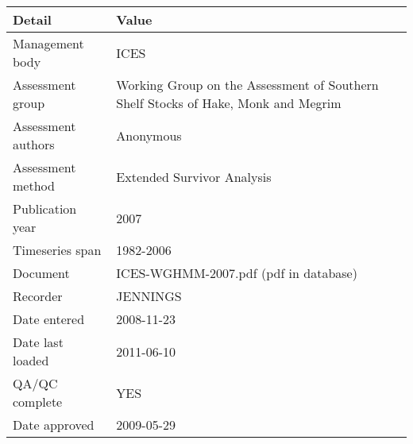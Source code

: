 \begin{table}[htb]
\centering
\begin{tabular}{lp{7cm}}
\toprule
Detail & Value \\
\midrule
Management body    & ICES                                                                              \\
Assessment group   & Working Group on the Assessment of Southern Shelf Stocks of Hake, Monk and Megrim \\
Assessment authors & Anonymous                                                                         \\
Assessment method  & Extended Survivor Analysis                                                        \\
Publication year   & 2007                                                                              \\
Timeseries span    & 1982-2006                                                                         \\
Document           & ICES-WGHMM-2007.pdf (pdf in database)                                             \\
Recorder           & JENNINGS                                                                          \\
Date entered       & 2008-11-23                                                                        \\
Date last loaded   & 2011-06-10                                                                        \\
QA/QC complete     & YES                                                                               \\
Date approved      & 2009-05-29                                                                        \\
\bottomrule
\end{tabular}
\label{tab:assessdet}
\end{table}
